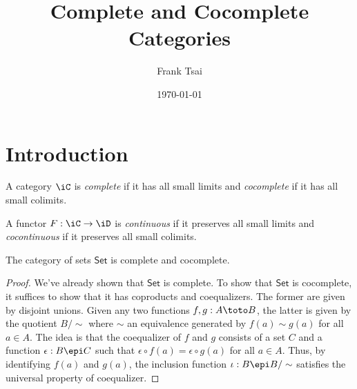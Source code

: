 \documentclass{amsart}
\title{Complete and Cocomplete Categories}
\author{Frank Tsai}
\date{\today}
\begin{document}
\maketitle
\tableofcontents

\section{Introduction}
\label{sec:introduction}
\begin{defn}
  A category $\iC$ is \emph{complete} if it has all small limits and \emph{cocomplete} if it has all small colimits.
\end{defn}
\begin{defn}
  A functor $F : \iC \to \iD$ is \emph{continuous} if it preserves all small limits and \emph{cocontinuous} if it preserves all small colimits.
\end{defn}

\begin{thm}
  The category of sets $\mathsf{Set}$ is complete and cocomplete.
\end{thm}
\begin{proof}
  We've already shown that $\mathsf{Set}$ is complete.
  To show that $\mathsf{Set}$ is cocomplete, it suffices to show that it has coproducts and coequalizers.
  The former are given by disjoint unions.
  Given any two functions $f,g : A \toto B$, the latter is given by the quotient $B/\sim$ where $\sim$ an equivalence generated by $f(a) \sim g(a)$ for all $a \in A$.
  The idea is that the coequalizer of $f$ and $g$ consists of a set $C$ and a function $\epsilon : B \epi C$ such that $\epsilon \circ f(a) = \epsilon \circ g(a)$ for all $a \in A$.
  Thus, by identifying $f(a)$ and $g(a)$, the inclusion function $\iota : B \epi B/\sim$ satisfies the universal property of coequalizer.
\end{proof}
\end{document}
